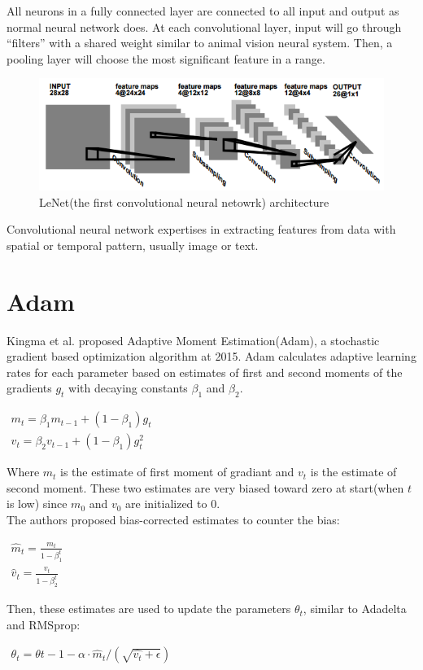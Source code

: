 \documentclass[12pt,openany,a4paper]{book}
\begin{document}
All neurons in a fully connected layer are connected to all input and output as normal neural network does. At each convolutional layer, input will go through “filters” with  a shared weight similar to animal vision neural system. Then, a pooling layer will choose the most significant feature in a range.\\

\begin{figure}[htbp]
\centerline{\includegraphics{conv.png}}
\caption{LeNet(the first convolutional neural netowrk) architecture\cite{lecun1995convolutional}}
\label{flr1}
\end{figure}

Convolutional neural network expertises in extracting features from data with spatial or temporal pattern, usually image or text. 

\section{Adam}

Kingma et al.\cite{kingmaadam} proposed Adaptive Moment Estimation(Adam), a stochastic gradient based optimization algorithm at 2015. Adam calculates adaptive learning rates for each parameter based on estimates of first and second moments of the gradients $g_{t}$ with decaying constants $\beta_{1}$ and $\beta_{2}$.

\begin{center}
$\begin{aligned}
m_{t}=\beta_{1}m_{t-1}+(1-\beta_{1})g_{t}\\
v_{t}=\beta_{2}v_{t-1}+(1-\beta_{1})g^{2}_{t} 
\end{aligned}$
\end{center}
Where $m_{t}$ is the estimate of first moment of gradiant and $v_{t}$ is the estimate of second moment. These two estimates are very biased toward zero at start(when $t$ is low) since $m_{0}$ and $v_{0}$ are initialized to 0.\\
The authors proposed bias-corrected estimates to counter the bias:
\begin{center}
$\begin{aligned}
\hat{m}_{t}=\frac{m_{t}}{1-\beta^{t}_{1}}\\
\hat{v}_{t}=\frac{v_{t}}{1-\beta^{t}_{2}}
\end{aligned}$
\end{center}
Then, these estimates are used to update the parameters $\theta_{t}$, similar to Adadelta and RMSprop:
\begin{center}
$\begin{aligned}
\theta_{t}=\theta{t-1}-\alpha\cdot\hat{m}_{t}/(\sqrt{\hat{v_{t}}+\epsilon})
\end{aligned}$
\end{center}
\end{document}
